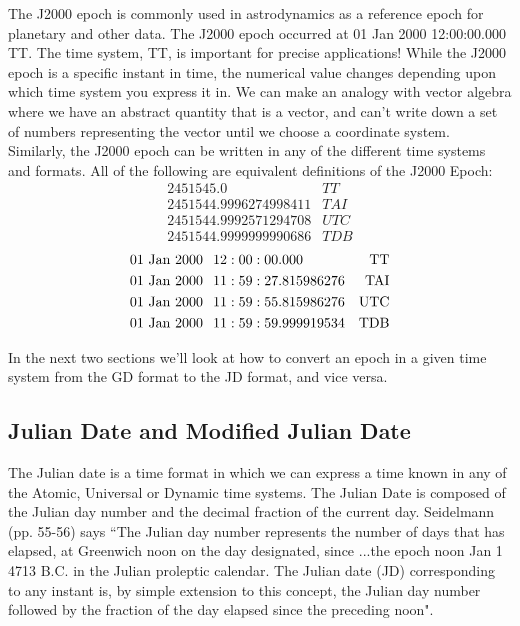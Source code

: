 The J2000 epoch  is commonly used in
astrodynamics as a reference epoch for planetary and other data. The
J2000 epoch occurred at 01 Jan 2000 12:00:00.000 TT.  The time
system, TT, is important for precise applications!  While the J2000
epoch is a specific instant in time, the numerical value changes
depending upon which time system you express it in. We can make an
analogy with vector algebra where we have an abstract quantity that
is a vector, and can't write down a set of numbers representing the
vector until we choose a coordinate system. Similarly, the J2000
epoch can be written in any of the different time systems and
formats. All of the following are equivalent definitions of the
J2000 Epoch:
%
\begin{eqnarray}
    2451545.0 & TT \nonumber \\
    2451544.9996274998411 & TAI \nonumber \\
    2451544.9992571294708 & UTC \nonumber\\
    2451544.9999999990686 & TDB \nonumber
\end{eqnarray}
%
\begin{eqnarray}
 & \mbox{01 Jan }   2000 \hspace{.1 in} 12:00:00.000  &\mbox{TT} \nonumber \\
& \mbox{01 Jan }  2000 \hspace{.1 in} 11:59:27.815986276  &\mbox{TAI} \nonumber \\
& \mbox{01 Jan }  2000 \hspace{.1 in} 11:59:55.815986276 &\mbox{UTC} \nonumber\\
 & \mbox{01 Jan }  2000 \hspace{.1 in} 11:59:59.999919534  &\mbox{TDB} \nonumber
\end{eqnarray}

In the next two sections we'll look at how to convert an epoch in a
given time system from the GD format to the JD format, and vice
versa.

\subsection{Julian Date and Modified Julian Date} \label{Sec:JDFormat}

The Julian date is a time format in which we can express a time
known in any of the Atomic, Universal or Dynamic time systems. The
Julian Date is composed of the Julian day number and the decimal
fraction of the current day.  Seidelmann\cite{seidelmann} (pp.
55-56) says ``The Julian day number represents the number of days
that has elapsed, at Greenwich noon on the day designated, since
...the epoch noon Jan 1 4713 B.C. in the Julian proleptic
calendar.  The Julian date (JD) corresponding to any instant is,
by simple extension to this concept, the Julian day number
followed by  the fraction of the day elapsed since the preceding
noon".

